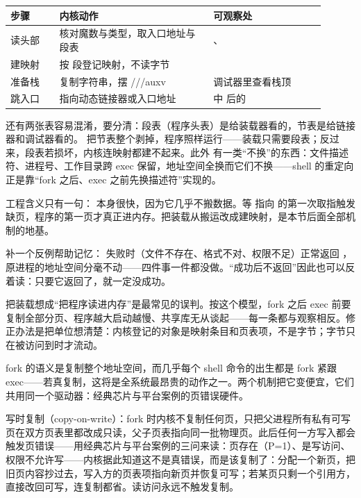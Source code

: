 \begin{longtable}{L{0.14\linewidth}L{0.44\linewidth}L{0.32\linewidth}}
\toprule
步骤 & 内核动作 & 可观察处 \\
\midrule
读头部 & 核对魔数与类型，取入口地址与段表 & 、 \\\tablerowrule
建映射 & 按  段登记映射，不读字节 &  \\\tablerowrule
准备栈 & 复制字符串，摆 ///auxv & 调试器里查看栈顶 \\\tablerowrule
跳入口 &  指向动态链接器或入口地址 &  中  后的  \\
\bottomrule
\end{longtable}

还有两张表容易混淆，要分清：段表（程序头表）是给装载器看的，节表是给链接器和调试器看的。 把节表整个剥掉，程序照样运行——装载只需要段表；反过来，段表若损坏，内核连映射都建不起来。此外  有一类“不换”的东西：文件描述符、进程号、工作目录跨 exec 保留，地址空间全换而它们不换——shell 的重定向正是靠“fork 之后、exec 之前先换描述符”实现的。

工程含义只有一句： 本身很快，因为它几乎不搬数据。等  指向  的第一次取指触发缺页，程序的第一页才真正进内存。把装载从搬运改成建映射，是本节后面全部机制的地基。

补一个反例帮助记忆： 失败时（文件不存在、格式不对、权限不足）正常返回 ，原进程的地址空间分毫不动——四件事一件都没做。“成功后不返回”因此也可以反着读：只要它返回了，就一定没成功。

\begin{warningbox}
把装载想成“把程序读进内存”是最常见的误判。按这个模型，fork 之后 exec 前要复制全部分页、程序越大启动越慢、共享库无从谈起——每一条都与观察相反。修正办法是把单位想清楚：内核登记的对象是映射条目和页表项，不是字节；字节只在被访问到时才流动。
\end{warningbox}

fork 的语义是复制整个地址空间，而几乎每个 shell 命令的出生都是 fork 紧跟 exec——若真复制，这将是全系统最昂贵的动作之一。两个机制把它变便宜，它们共用同一个驱动器：经典芯片与平台案例的页错误硬件。

写时复制（copy-on-write）：fork 时内核不复制任何页，只把父进程所有私有可写页在双方页表里都改成只读，父子页表指向同一批物理页。此后任何一方写入都会触发页错误——用经典芯片与平台案例的三问来读：页存在（P=1）、是写访问、权限不允许写——内核据此知道这不是真错误，而是该复制了：分配一个新页，把旧页内容抄过去，写入方的页表项指向新页并恢复可写；若某页只剩一个引用方，直接改回可写，连复制都省。读访问永远不触发复制。

